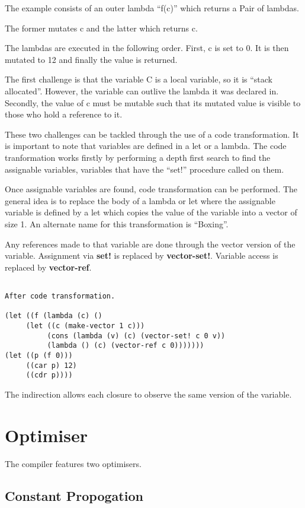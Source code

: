 \documentclass{article}
\begin{document}
The example consists of an outer lambda ``f(c)'' which returns a Pair of lambdas.

The former mutates c and the latter which returns c.

The lambdas are executed in the following order. First, c is set to 0. It is then mutated to 12 and finally the value is returned.

The first challenge is that the variable C is a local variable, so it is ``stack allocated''. However, the variable can outlive the lambda it was declared in. Secondly, the value of c must be mutable such that its mutated value is visible to those who hold a reference to it.

These two challenges can be tackled through the use of a code transformation. It is important to note that variables are defined in a let or a lambda. The code tranformation works firstly by performing a depth first search to find the assignable variables, variables that have the ``set!'' procedure called on them.

Once assignable variables are found, code transformation can be performed. The general idea is to replace the body of a lambda or let where the assignable variable is defined by a let which copies the value of the variable into a vector of size 1. An alternate name for this transformation is ``Boxing''.

Any references made to that variable are done through the vector version of the variable. Assignment via \textbf{set!} is replaced by \textbf{vector-set!}. Variable access is replaced by \textbf{vector-ref}.

\begin{verbatim}

After code transformation. 

(let ((f (lambda (c) ()
     (let ((c (make-vector 1 c)))
     	  (cons (lambda (v) (c) (vector-set! c 0 v))
	  	  (lambda () (c) (vector-ref c 0)))))))
(let ((p (f 0)))
     ((car p) 12)
     ((cdr p))))
\end{verbatim}

The indirection allows each closure to observe the same version of the variable.

\section{Optimiser}

The compiler features two optimisers.

\subsection{Constant Propogation}
\end{document}

